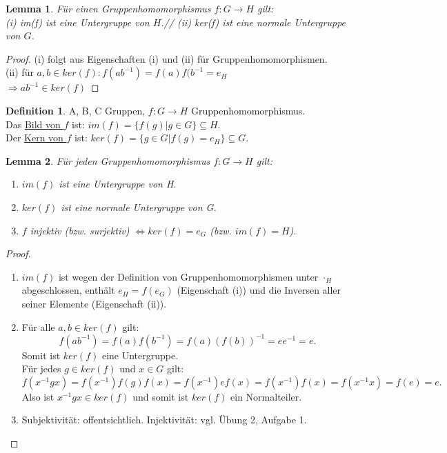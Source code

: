 \documentclass[12pt]{scrartcl}%
\newtheorem{lemma}{Lemma}
\theoremstyle{definition}
\newtheorem*{defn}{Definition}
\theoremstyle{remark}
\begin{document}
\begin{lemma}
F{\"u}r einen Gruppenhomomorphismus $f: G \rightarrow H$ gilt:\\
(i) im(f) ist eine Untergruppe von $H$.//
(ii) ker(f) ist eine normale Untergruppe von $G$.
\end{lemma}

\begin{proof}
(i) folgt aus Eigenschaften (i) und (ii) für Gruppenhomomorphismen.\\
(ii) f{\"u}r $a,b \in ker(f): f(ab^{-1})=f(a)f(b^{-1}=e_H$\\
$\Rightarrow ab^{-1} \in ker(f)$
\end{proof}



\newpage





\begin{defn}
	A, B, C Gruppen, $ f: G \rightarrow H$ Gruppenhomomorphismus. \\
	Das \underline{Bild von $f$} ist: $im(f) = \{f(g) | g \in G\} \subseteq H$. \\
	Der \underline{Kern von $f$} ist: $ker(f) = \{g \in G | f(g) = e_H\} \subseteq G$.
\end{defn}

\begin{lemma}
	Für jeden Gruppenhomomorphismus $ f: G \rightarrow H$ gilt:
	\begin{enumerate}[label=(\roman*)]
		\item $im(f)$ ist eine Untergruppe von H.
		\item $ker(f)$ ist eine normale Untergruppe von G.
		\item $f$ injektiv (bzw. surjektiv) $ \Leftrightarrow ker(f) = {e_G}$ (bzw. $im(f) = H$).
	\end{enumerate}
\end{lemma}

\begin{proof}
	\begin{enumerate}[label=(\roman*)]
		\item $im(f)$ ist wegen der Definition von Gruppenhomomorphismen unter $\cdot_H$ abgeschlossen, enthält $e_H = f(e_G)$ (Eigenschaft (i)) und die Inversen aller seiner Elemente (Eigenschaft (ii)).
		\item Für alle $a, b \in ker(f)$ gilt:
			$$ f(ab^{-1}) = f(a)f(b^{-1}) = f(a)(f(b))^{-1} = ee^{-1} = e.$$
			Somit ist $ker(f)$ eine Untergruppe. \\
			Für jedes $ g \in ker(f)$ und $x \in G$ gilt:
			$$ f(x^{-1}gx) = f(x^{-1})f(g)f(x) = f(x^{-1}) e f(x) = f(x^{-1})f(x) = f(x^{-1}x) = f(e) = e.$$
			Also ist $x^{-1}gx \in ker(f) $ und somit ist $ker(f)$ ein Normalteiler.
		\item Subjektivität: offentsichtlich. Injektivität: vgl. Übung 2, Aufgabe 1.
	\end{enumerate}	
\end{proof}
\end{document}
